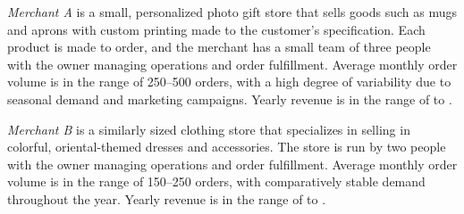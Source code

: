 \documentclass{imc-inf}
\begin{document}
\textit{Merchant A} is a small, personalized photo gift store that sells goods such as mugs and aprons with custom printing made to the customer's specification.
Each product is made to order, and the merchant has a small team of three people with the owner managing operations and order fulfillment.
Average monthly order volume is in the range of 250--500 orders, with a high degree of variability due to seasonal demand and marketing campaigns.
Yearly revenue is in the range of  to .

\textit{Merchant B} is a similarly sized clothing store that specializes in selling in colorful, oriental-themed dresses and accessories.
The store is run by two people with the owner managing operations and order fulfillment.
Average monthly order volume is in the range of 150--250 orders, with comparatively stable demand throughout the year.
Yearly revenue is in the range of  to .
\end{document}
